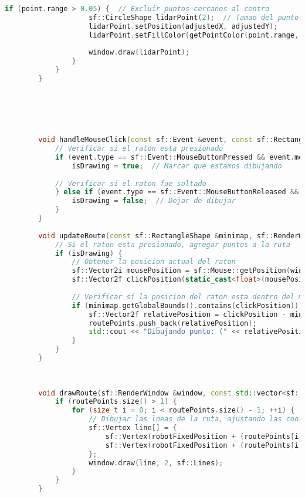 \begin{lstlisting}[language={C++}, caption={Quinto ajuste de c\'odigo}, label={QuintoAjuste}]
                if (point.range > 0.05) {  // Excluir puntos cercanos al centro
                    sf::CircleShape lidarPoint(2);  // Tamao del punto
                    lidarPoint.setPosition(adjustedX, adjustedY);
                    lidarPoint.setFillColor(getPointColor(point.range, max_range));  // Color basado en la distancia
        
                    window.draw(lidarPoint);
                }
            }
        }
        
        
        
        
        
        
        void handleMouseClick(const sf::Event &event, const sf::RectangleShape &minimap) {
            // Verificar si el raton esta presionado
            if (event.type == sf::Event::MouseButtonPressed && event.mouseButton.button == sf::Mouse::Left) {
                isDrawing = true;  // Marcar que estamos dibujando
        
            // Verificar si el raton fue soltado
            } else if (event.type == sf::Event::MouseButtonReleased && event.mouseButton.button == sf::Mouse::Left) {
                isDrawing = false;  // Dejar de dibujar
            }
        }
        
        void updateRoute(const sf::RectangleShape &minimap, sf::RenderWindow &window) {
            // Si el raton esta presionado, agregar puntos a la ruta
            if (isDrawing) {
                // Obtener la posicion actual del raton
                sf::Vector2i mousePosition = sf::Mouse::getPosition(window);
                sf::Vector2f clickPosition(static_cast<float>(mousePosition.x), static_cast<float>(mousePosition.y));
        
                // Verificar si la posicion del raton esta dentro del minimapa
                if (minimap.getGlobalBounds().contains(clickPosition)) {
                    sf::Vector2f relativePosition = clickPosition - minimap.getPosition();
                    routePoints.push_back(relativePosition);
                    std::cout << "Dibujando punto: (" << relativePosition.x << ", " << relativePosition.y << ")" << std::endl;
                }
            }
        }
        
        
        
        void drawRoute(sf::RenderWindow &window, const std::vector<sf::Vector2f> &routePoints, const sf::Vector2f &robotPosition) {
            if (routePoints.size() > 1) {
                for (size_t i = 0; i < routePoints.size() - 1; ++i) {
                    // Dibujar las lneas de la ruta, ajustando las coordenadas en funcin de la posicin del robot
                    sf::Vertex line[] = {
                        sf::Vertex(robotFixedPosition + (routePoints[i] - robotPosition), sf::Color::Red),  // Ajustar posicin en funcin del robot
                        sf::Vertex(robotFixedPosition + (routePoints[i + 1] - robotPosition), sf::Color::Red)
                    };
                    window.draw(line, 2, sf::Lines);
                }
            }
        }
        

\end{lstlisting}
